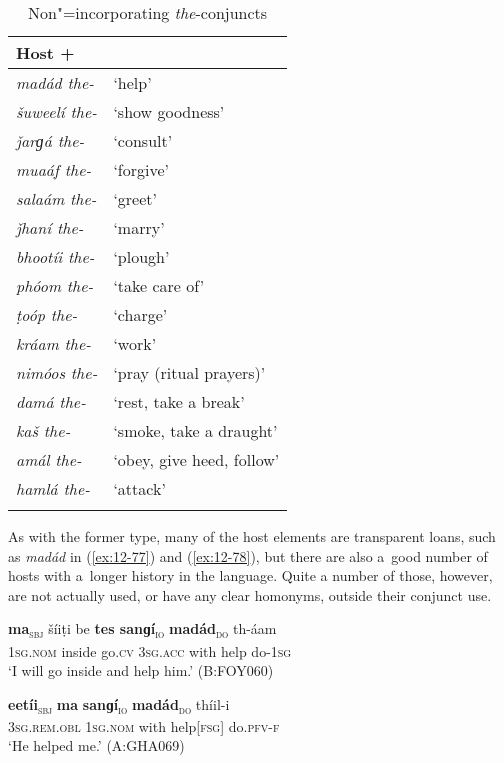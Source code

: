 \begin{table}[ht]
\caption{Non"=incorporating \textit{the}-conjuncts}
\begin{tabularx}{.75\textwidth}{ l@{\hspace{45pt}} Q} 
\lsptoprule
Host +  &
\\\midrule
\textit{madád the-} &
`help'\\
\textit{šuweelí the-} &
`show goodness'\\
\textit{ǰarɡá the-} &
`consult'\\
\textit{muaáf the-} &
`forgive'\\
\textit{salaám the-} &
`greet'\\
\textit{ǰhaní the-} &
`marry'\\
\textit{bhootíi the-} &
`plough'\\
\textit{phóom the-} &
`take care of'\\
\textit{ṭoóp the-} &
`charge'\\
\textit{kráam the-} &
`work'\\
\textit{nimóos the-} &
`pray (ritual prayers)'\\
\textit{damá the-} &
`rest, take a break'\\
\textit{kaš the-} &
`smoke, take a draught'\\
\textit{amál the-} &
`obey, give heed, follow'\\
\textit{hamlá the-} &
`attack'\\\lspbottomrule
\end{tabularx}
\label{tab:12-4}
\end{table}


As with the former type, many of the host elements are transparent loans, such as \textit{madád} in (\ref{ex:12-77}) and (\ref{ex:12-78}), but there are also a~good number of hosts with a~longer history in the language. Quite a number of those, however, are not actually used, or have any clear homonyms, outside their conjunct use.

\begin{exe}
\ex
\label{ex:12-77}
\gll {\ob}\textbf{ma}{\cb}\textsubscript{\textsc{\upshape sbj}} šíiṭi be {\ob}\textbf{tes sanɡí}{\cb}\textsubscript{\textsc{\upshape io}} {\ob}\textbf{madád}{\cb}\textsubscript{\textsc{\upshape do}} th-áam\\
\textsc{1sg.nom} inside go.\textsc{cv} \textsc{3sg.acc} with help do-\textsc{1sg}\\
\glt `I will go inside and help him.' (B:FOY060)
\end{exe}
\begin{exe}
\ex
\label{ex:12-78}
\gll {\ob}\textbf{eetíi}{\cb}\textsubscript{\textsc{\upshape sbj}} {\ob}\textbf{ma} \textbf{sanɡí}{\cb}\textsubscript{\textsc{\upshape io}} {\ob}\textbf{madád}{\cb}\textsubscript{\textsc{\upshape do}} thíil-i\\
\textsc{3sg.rem.obl} \textsc{1sg.nom} with help[\textsc{fsg]} do.\textsc{pfv-f}\\
\glt `He helped me.' (A:GHA069)
\end{exe}

